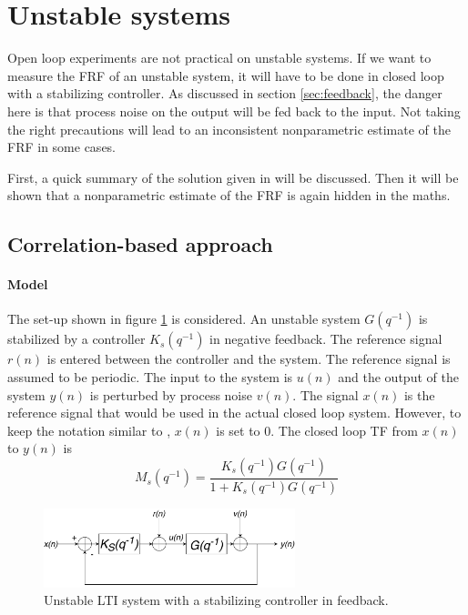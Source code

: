 \newpage
\section{Unstable systems}
\label{appendix:unstable}
Open loop experiments are not practical on unstable systems. If we want to measure the FRF of an unstable system, it will have to be done in closed loop with a stabilizing controller. As discussed in section \ref{sec:feedback}, the danger here is that process noise on the output will be fed back to the input. Not taking the right precautions will lead to an inconsistent nonparametric estimate of the FRF in some cases.

First, a quick summary of the solution given in \cite{Data-driven_model_reference_control} will be discussed. Then it will be shown that a nonparametric estimate of the FRF is again hidden in the maths.

\subsection{Correlation-based approach}
\paragraph{Model}
The set-up shown in figure \ref{fig:unstable_system} is considered. An unstable system $G(q^{-1})$ is stabilized by a controller $K_s(q^{-1})$ in negative feedback. The reference signal $r(n)$ is entered between the controller and the system. The reference signal is assumed to be periodic. The input to the system is $u(n)$ and the output of the system $y(n)$ is perturbed by process noise $v(n)$. The signal $x(n)$ is the reference signal that would be used in the actual closed loop system. However, to keep the notation similar to \cite{Data-driven_model_reference_control}, $x(n)$ is set to 0. The closed loop TF from $x(n)$ to $y(n)$ is
\begin{equation*}
    M_s(q^{-1}) = \frac{K_s(q^{-1}) G(q^{-1})}{1 + K_s(q^{-1}) G(q^{-1})}
\end{equation*}

\begin{figure}[H]
    \centering
    \includegraphics[width = 0.65\textwidth]{figures/unstable_system.pdf}
    \caption{Unstable LTI system with a stabilizing controller in feedback.}
    \label{fig:unstable_system}
\end{figure}

